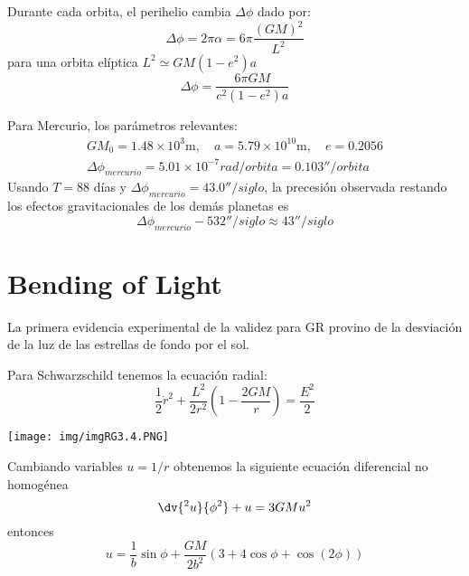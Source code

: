 \documentclass[../main]{subfiles}
\begin{document}
\begin{adjustwidth}{0pt}{-100pt}
Durante cada orbita, el perihelio cambia $\Delta \phi$ dado por:
\begin{equation}
    \Delta \phi=2\pi \alpha=6\pi\dfrac{(GM)^2}{L^2}
\end{equation}
para una orbita elíptica $L^2 \simeq GM(1-e^2)a$
\begin{equation}
    \Delta \phi = \dfrac{6\pi GM}{c^2(1-e^2)a}
\end{equation}

Para Mercurio, los parámetros relevantes:
\begin{equation}
    \begin{aligned}
        GM_0=1.48\times 10^3 \text{m},\quad a=5.79\times 10^{10}\text{m},\quad e=0.2056\\
        \Delta \phi_{mercurio}=5.01\times 10^{-7} rad/orbita=0.103''/orbita 
    \end{aligned}
\end{equation}
Usando $T=88$ días y $\Delta \phi_{mercurio}=43.0''/siglo$, la precesión observada restando los efectos gravitacionales de los demás planetas es 
\begin{equation}
    \Delta \phi_{mercurio}-532''/siglo\approx 43''/siglo
\end{equation}

\section{Bending of Light}\label{part3.9}

La primera evidencia experimental de la validez para GR provino de la desviación de la luz de las estrellas de fondo por el sol.

Para Schwarzschild tenemos la ecuación radial:
\begin{equation}
    \dfrac{1}{2}\dot{r}^2+\dfrac{L^2}{2r^2}\left(1-\dfrac{2GM}{r}\right)=\dfrac{E^2}{2}
\end{equation}
\begin{center}
    \texttt{[image: img/imgRG3.4.PNG]}
\end{center}

Cambiando variables $u=1/r$ obtenemos la siguiente ecuación diferencial no homogénea
\begin{equation}
    \dv{^2 u}{\phi^2}+u=3GM u^2
\end{equation}
entonces 
\begin{equation}
    u=\dfrac{1}{b}\sin \phi+\dfrac{GM}{2b^2}(3+4\cos \phi+\cos (2\phi))
\end{equation}


\end{adjustwidth}
\end{document}
